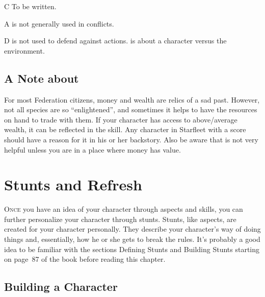 \documentclass[12pt,titlepage,openany]{book}
\begin{document}
\begin{NewSkillAction}[+]{C}
    To be written.
\end{NewSkillAction}

\begin{NewSkillAction}[+]{A}
     is not generally used in conflicts.
\end{NewSkillAction}

\begin{NewSkillAction}{D}
     is not used to defend against actions.  is
    about a character versus the environment.
\end{NewSkillAction}

\section{A Note about }\label{sec:note-resources}

For most Federation citizens, money and wealth are relics of a sad past.
However, not all species are so ``enlightened'', and sometimes it helps to have
the resources on hand to trade with them. If your character has access to
above\-/average wealth, it can be reflected in the  skill. Any
character in Starfleet with a  score should have a reason for
it in his or her backstory. Also be aware that  is not very
helpful unless you are in a place where money has value.



\chapter{Stunts and Refresh}\label{chap:stunts}

\lettrine[lines=1]{O}{nce} you have an idea of your character through aspects
and skills, you can further personalize your character through stunts. Stunts,
like aspects, are created for your character personally. They describe your
character's way of doing things and, essentially, how he or she gets to break
the rules. It's probably a good idea to be familiar with the sections Defining
Stunts and Building Stunts starting on page~87 of the \FateCore{} book before
reading this chapter.

\section{Building a Character}\label{sec:building}
\end{document}
